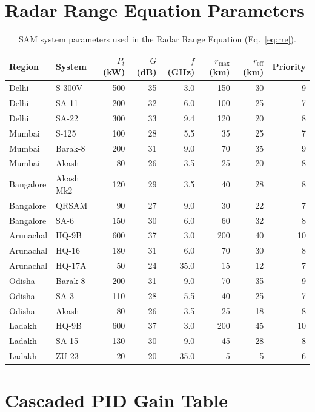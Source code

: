 \documentclass{article}
\begin{document}
\section{Radar Range Equation Parameters}
\label{app:rre_params}

\begin{table}[h]
\centering
\caption{SAM system parameters used in the Radar Range Equation (Eq.~\ref{eq:rre}).}
\small
\begin{tabular}{llrrrrrr}
\toprule
Region & System & $P_t$ (kW) & $G$ (dB) & $f$ (GHz) & $r_\text{max}$ (km) & $r_\text{eff}$ (km) & Priority \\
\midrule
Delhi & S-300V & 500 & 35 & 3.0 & 150 & 30 & 9 \\
Delhi & SA-11  & 200 & 32 & 6.0 & 100 & 25 & 7 \\
Delhi & SA-22  & 300 & 33 & 9.4 & 120 & 20 & 8 \\
Mumbai & S-125  & 100 & 28 & 5.5 &  35 & 25 & 7 \\
Mumbai & Barak-8 & 200 & 31 & 9.0 &  70 & 35 & 9 \\
Mumbai & Akash  &  80 & 26 & 3.5 &  25 & 20 & 8 \\
Bangalore & Akash Mk2 & 120 & 29 & 3.5 & 40 & 28 & 8 \\
Bangalore & QRSAM     &  90 & 27 & 9.0 & 30 & 22 & 7 \\
Bangalore & SA-6      & 150 & 30 & 6.0 & 60 & 32 & 8 \\
Arunachal & HQ-9B  & 600 & 37 & 3.0 & 200 & 40 & 10 \\
Arunachal & HQ-16  & 180 & 31 & 6.0 &  70 & 30 &  8 \\
Arunachal & HQ-17A &  50 & 24 & 35.0 &  15 & 12 &  7 \\
Odisha & Barak-8  & 200 & 31 & 9.0 &  70 & 35 & 9 \\
Odisha & SA-3     & 110 & 28 & 5.5 &  40 & 25 & 7 \\
Odisha & Akash    &  80 & 26 & 3.5 &  25 & 18 & 8 \\
Ladakh & HQ-9B  & 600 & 37 & 3.0 & 200 & 45 & 10 \\
Ladakh & SA-15  & 130 & 30 & 9.0 &  45 & 28 &  8 \\
Ladakh & ZU-23  &  20 & 20 & 35.0 &   5 &  5 &  6 \\
\bottomrule
\end{tabular}
\end{table}

\section{Cascaded PID Gain Table}
\label{app:pid_gains}
\end{document}
